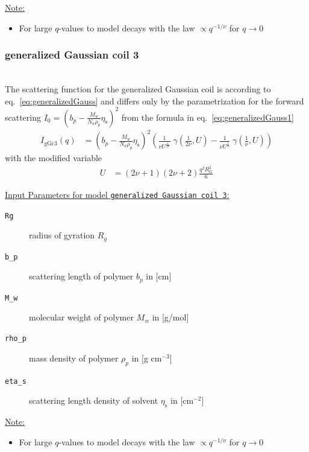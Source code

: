 \noindent \uline{Note:}
\begin{itemize}
\item For large $q$-values to model decays with the law $\propto q^{-1/\nu}$ for $q \rightarrow 0$
\end{itemize}
\vspace{5mm}

\subsubsection{generalized Gaussian coil 3} \cite{Hammouda,Hammouda2012}
\label{sect:generalized_gaussian_coil3}
~\\
The scattering function for the generalized Gaussian coil is according to eq.\ \ref{eq:generalizedGauss}
and differs only by the parametrization for the forward scattering
$I_0=(b_p-\frac{M_w}{N_a\rho_p}\eta_\text{s})^2$ from the formula in eq.\ \ref{eq:generalizedGauss1}
\begin{align}
I_\text{gGc3}(q) &= \left(b_p-\frac{M_w}{N_a\rho_p}\eta_\text{s}\right)^2
\left(
\frac{1}{\nu U^{\frac{1}{2 \nu}}} \; \gamma\left(\frac{1}{2 \nu},U\right)-
\frac{1}{\nu U^{\frac{1}{  \nu}}} \; \gamma\left(\frac{1}{  \nu},U\right)
\right)
\label{eq:generalizedGauss3}
\end{align}
with the modified variable
\begin{align}
U&= \left(2\nu+1\right)\left(2\nu+2\right)\frac{q^2R_G^2}{6}
\end{align}

\vspace{5mm}
\noindent \uline{Input Parameters for model \texttt{generalized Gaussian coil 3}:}
\begin{description}
\item[\texttt{Rg}] radius of gyration $R_g$
\item[\texttt{b\_p}] scattering length of polymer $b_p$ in [cm]
\item[\texttt{M\_w}] molecular weight of polymer $M_w$ in [g/mol]
\item[\texttt{rho\_p}] mass density of polymer $\rho_p$ in [g cm$^{-3}$]
\item[\texttt{eta\_s}] scattering length density of solvent $\eta_\text{s}$ in [cm$^{-2}$]
\end{description}
\vspace{5mm}

\noindent \uline{Note:}
\begin{itemize}
\item For large $q$-values to model decays with the law $\propto q^{-1/\nu}$ for $q \rightarrow 0$
\end{itemize}
\vspace{5mm}

